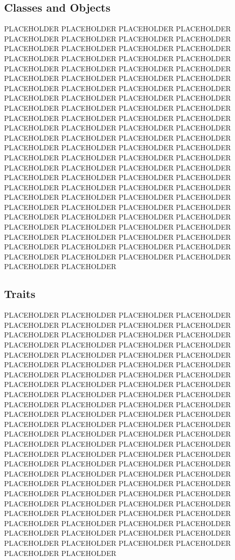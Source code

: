 \subsection{Classes and Objects}

PLACEHOLDER PLACEHOLDER PLACEHOLDER PLACEHOLDER PLACEHOLDER PLACEHOLDER PLACEHOLDER PLACEHOLDER PLACEHOLDER PLACEHOLDER PLACEHOLDER PLACEHOLDER PLACEHOLDER PLACEHOLDER PLACEHOLDER PLACEHOLDER PLACEHOLDER PLACEHOLDER PLACEHOLDER PLACEHOLDER PLACEHOLDER PLACEHOLDER PLACEHOLDER PLACEHOLDER PLACEHOLDER PLACEHOLDER PLACEHOLDER PLACEHOLDER PLACEHOLDER PLACEHOLDER PLACEHOLDER PLACEHOLDER PLACEHOLDER PLACEHOLDER PLACEHOLDER PLACEHOLDER PLACEHOLDER PLACEHOLDER PLACEHOLDER PLACEHOLDER PLACEHOLDER PLACEHOLDER PLACEHOLDER PLACEHOLDER PLACEHOLDER PLACEHOLDER PLACEHOLDER PLACEHOLDER PLACEHOLDER PLACEHOLDER PLACEHOLDER PLACEHOLDER PLACEHOLDER PLACEHOLDER PLACEHOLDER PLACEHOLDER PLACEHOLDER PLACEHOLDER PLACEHOLDER PLACEHOLDER PLACEHOLDER PLACEHOLDER PLACEHOLDER PLACEHOLDER PLACEHOLDER PLACEHOLDER PLACEHOLDER PLACEHOLDER PLACEHOLDER PLACEHOLDER PLACEHOLDER PLACEHOLDER PLACEHOLDER PLACEHOLDER PLACEHOLDER PLACEHOLDER PLACEHOLDER PLACEHOLDER PLACEHOLDER PLACEHOLDER PLACEHOLDER PLACEHOLDER PLACEHOLDER PLACEHOLDER PLACEHOLDER PLACEHOLDER PLACEHOLDER PLACEHOLDER PLACEHOLDER PLACEHOLDER PLACEHOLDER PLACEHOLDER PLACEHOLDER PLACEHOLDER PLACEHOLDER PLACEHOLDER PLACEHOLDER PLACEHOLDER

\subsection{Traits}

PLACEHOLDER PLACEHOLDER PLACEHOLDER PLACEHOLDER PLACEHOLDER PLACEHOLDER PLACEHOLDER PLACEHOLDER PLACEHOLDER PLACEHOLDER PLACEHOLDER PLACEHOLDER PLACEHOLDER PLACEHOLDER PLACEHOLDER PLACEHOLDER PLACEHOLDER PLACEHOLDER PLACEHOLDER PLACEHOLDER PLACEHOLDER PLACEHOLDER PLACEHOLDER PLACEHOLDER PLACEHOLDER PLACEHOLDER PLACEHOLDER PLACEHOLDER PLACEHOLDER PLACEHOLDER PLACEHOLDER PLACEHOLDER PLACEHOLDER PLACEHOLDER PLACEHOLDER PLACEHOLDER PLACEHOLDER PLACEHOLDER PLACEHOLDER PLACEHOLDER PLACEHOLDER PLACEHOLDER PLACEHOLDER PLACEHOLDER PLACEHOLDER PLACEHOLDER PLACEHOLDER PLACEHOLDER PLACEHOLDER PLACEHOLDER PLACEHOLDER PLACEHOLDER PLACEHOLDER PLACEHOLDER PLACEHOLDER PLACEHOLDER PLACEHOLDER PLACEHOLDER PLACEHOLDER PLACEHOLDER PLACEHOLDER PLACEHOLDER PLACEHOLDER PLACEHOLDER PLACEHOLDER PLACEHOLDER PLACEHOLDER PLACEHOLDER PLACEHOLDER PLACEHOLDER PLACEHOLDER PLACEHOLDER PLACEHOLDER PLACEHOLDER PLACEHOLDER PLACEHOLDER PLACEHOLDER PLACEHOLDER PLACEHOLDER PLACEHOLDER PLACEHOLDER PLACEHOLDER PLACEHOLDER PLACEHOLDER PLACEHOLDER PLACEHOLDER PLACEHOLDER PLACEHOLDER PLACEHOLDER PLACEHOLDER PLACEHOLDER PLACEHOLDER PLACEHOLDER PLACEHOLDER PLACEHOLDER PLACEHOLDER PLACEHOLDER PLACEHOLDER

